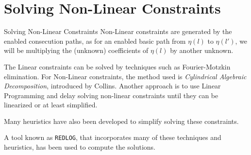 \documentclass{beamer}
\begin{document}
    \section{Solving Non-Linear Constraints}
    {
        \begin{frame}{Solving Non-Linear Constraints}
            Non-Linear constraints are generated by the enabled consecution paths, as for an enabled basic path from $\eta(l)$ to $\eta(l')$, we will be multiplying the (unknown) coefficients of $\eta(l)$ by another unknown.

            The Linear constraints can be solved by techniques such as Fourier-Motzkin elimination. For Non-Linear constraints, the method used is \textit{Cylindrical Algebraic Decomposition}, introduced by Collins. Another approach is to use Linear Programming and delay solving non-linear constraints until they can be linearized or at least simplified. 

            Many heuristics have also been developed to simplify solving these constraints.

            A tool known as \texttt{REDLOG}, that incorporates many of these techniques and heuristics, has been used to compute the solutions.
        \end{frame}
    }

                
\end{document}
